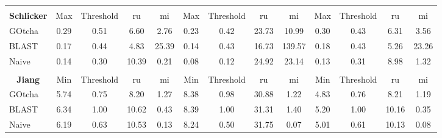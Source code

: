 \begin{table}[t]
{\begin{tabular}{c|cccc|cccc|cccc}
\multicolumn{1}{l}{\hphantom} & & & &\multicolumn{1}{c}{\hphantom} & & & & \multicolumn{1}{c}{\hphantom} & & & &\\
\bf Schlicker & Max & Threshold & ru & mi & Max & Threshold & ru & mi & Max & Threshold & ru & mi\\
\hline
\multicolumn{1}{l|}{GOtcha}& 0.29 & 0.51 & 6.60 & 2.76 & 0.23 & 0.42 & 23.73 & 10.99 & 0.30 & 0.43 & 6.31 & 3.56 \\
\multicolumn{1}{l|}{BLAST}& 0.17 & 0.44 & 4.83 & 25.39 & 0.14 & 0.43 & 16.73 & 139.57 & 0.18 & 0.43 & 5.26 & 23.26 \\
\multicolumn{1}{l|}{Naive}& 0.14 & 0.30 & 10.39 & 0.21 & 0.08 & 0.12 & 24.92 & 23.14 & 0.13 & 0.31 & 8.98 & 1.32 \\

\multicolumn{1}{l}{\hphantom} & & & &\multicolumn{1}{c}{\hphantom} & & & & \multicolumn{1}{c}{\hphantom} & & & &\\

\bf Jiang & Min & Threshold & ru & mi & Min & Threshold & ru & mi & Min & Threshold & ru & mi\\
\hline
\multicolumn{1}{l|}{GOtcha}& 5.74 & 0.75 & 8.20 & 1.27 & 8.38 & 0.98 & 30.88 & 1.22 & 4.83 & 0.76 & 8.21 & 1.19 \\
\multicolumn{1}{l|}{BLAST}& 6.34 & 1.00 & 10.62 & 0.43 & 8.39 & 1.00 & 31.31 & 1.40 & 5.20 & 1.00 & 10.16 & 0.35 \\
\multicolumn{1}{l|}{Naive}& 6.19 & 0.63 & 10.53 & 0.13 & 8.24 & 0.50 & 31.75 & 0.07 & 5.01 & 0.61 & 10.13 & 0.08 \\



\end{tabular}}
\end{table}
